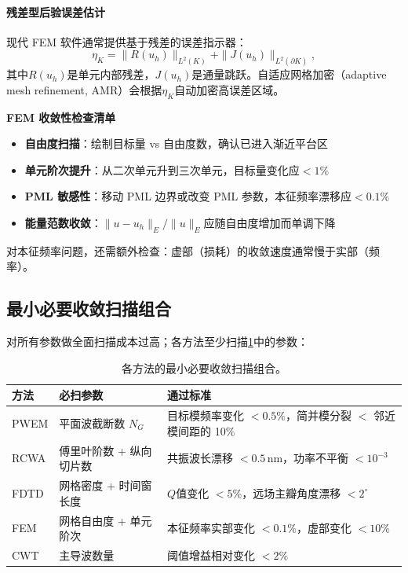 \paragraph{残差型后验误差估计}
现代 FEM 软件通常提供基于残差的误差指示器：
\begin{equation}
\eta_K = \|R(u_h)\|_{L^2(K)} + \|J(u_h)\|_{L^2(\partial K)},
\label{eq:fem_residual_estimator}
\end{equation}
其中$R(u_h)$是单元内部残差，$J(u_h)$是通量跳跃。自适应网格加密（adaptive mesh refinement, AMR）会根据$\eta_K$自动加密高误差区域。

\begin{NumericalErrorBox}
\textbf{FEM 收敛性检查清单}
\begin{itemize}
  \item \textbf{自由度扫描}：绘制目标量 vs 自由度数，确认已进入渐近平台区
  \item \textbf{单元阶次提升}：从二次单元升到三次单元，目标量变化应$<1\%$
  \item \textbf{PML 敏感性}：移动 PML 边界或改变 PML 参数，本征频率漂移应$<0.1\%$
  \item \textbf{能量范数收敛}：$\|u-u_h\|_E/\|u\|_E$应随自由度增加而单调下降
\end{itemize}
对本征频率问题，还需额外检查：虚部（损耗）的收敛速度通常慢于实部（频率）。
\end{NumericalErrorBox}


\subsection{最小必要收敛扫描组合}
对所有参数做全面扫描成本过高；各方法至少扫描\cref{tab:min-convergence-scan}中的参数：

\begin{table}[htbp]
  \centering
  \footnotesize
  \caption{各方法的最小必要收敛扫描组合。}
  \label{tab:min-convergence-scan}
  \begin{tabularx}{\textwidth}{@{}p{2cm}p{3.5cm}X@{}}
    \toprule
    方法 & 必扫参数 & 通过标准 \\
    \midrule
    PWEM & 平面波截断数 $N_G$ & 目标模频率变化 $< 0.5\%$，简并模分裂 $<$ 邻近模间距的 10\% \\
    RCWA & 傅里叶阶数 + 纵向切片数 & 共振波长漂移 $< 0.5\,$nm，功率不平衡 $< 10^{-3}$ \\
    FDTD & 网格密度 + 时间窗长度 & $Q$值变化 $< 5\%$，远场主瓣角度漂移 $< 2^\circ$ \\
    FEM & 网格自由度 + 单元阶次 & 本征频率实部变化 $< 0.1\%$，虚部变化 $< 10\%$ \\
    CWT & 主导波数量 & 阈值增益相对变化 $< 2\%$ \\
    \bottomrule
  \end{tabularx}
\end{table}

